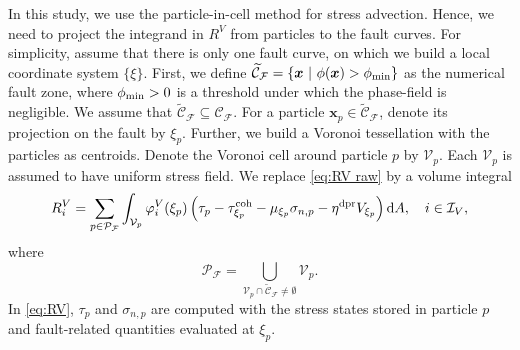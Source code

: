 \documentclass{article}
\begin{document}
In this study, we use the particle-in-cell method for stress advection. Hence, we need to project the integrand in $R^V$ from particles to the fault curves. For simplicity, assume that there is only one fault curve, on which we build a local coordinate system $\{\xi\}$. First, we define $\widetilde{\mathcal C}_{\mathcal F} = \{\bm x~|~\phi(\bm x) > \phi_{\rm min}\}$ as the numerical fault zone, where $\phi_{\rm min} > 0$ is a threshold under which the phase-field is negligible. We assume that $\widetilde{\mathcal C}_{\mathcal F}\subseteq\mathcal C_{\mathcal F}$. For a particle $\bm x_p\in\widetilde{\mathcal C}_{\mathcal F}$, denote its projection on the fault by $\xi_p$. Further, we build a Voronoi tessellation with the particles as centroids. Denote the Voronoi cell around particle $p$ by $\mathcal V_p$. Each $\mathcal V_p$ is assumed to have uniform stress field. We replace \eqref{eq:RV raw} by a volume integral
\begin{equation}\label{eq:RV}
  R^V_i = \sum_{p\in\mathcal P_{\mathcal F}}\int_{\mathcal V_p}\varphi_i^V(\xi_p)\left(\tau_p - \tau_{\xi_p}^{\rm coh} - \mu_{\xi_p}\sigma_{n,p} - \eta^{\rm dpr}V_{\xi_p}\right)\mathrm dA,\quad i\in\mathcal I_V,
\end{equation}
where
\[
  \mathcal P_{\mathcal F} = \bigcup_{\mathcal V_p\cap\widetilde{\mathcal C}_{\mathcal F}\neq\emptyset}\mathcal V_p.
\]
In \eqref{eq:RV}, $\tau_p$ and $\sigma_{n,p}$ are computed with the stress states stored in particle $p$ and fault-related quantities evaluated at $\xi_p$.
\end{document}
